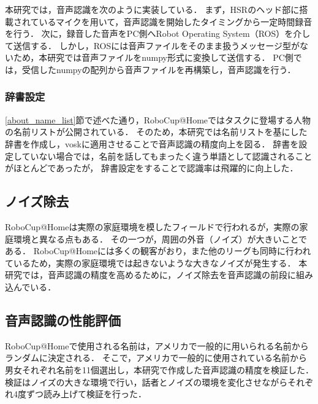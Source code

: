 \documentclass[a4j]{jarticle}
\begin{document}
本研究では，音声認識を次のように実装している．
まず，HSRのヘッド部に搭載されているマイクを用いて，音声認識を開始したタイミングから一定時間録音を行う．
次に，録音した音声をPC側へRobot Operating System（ROS）\cite{ros_wiki}を介して送信する．
しかし，ROSには音声ファイルをそのまま扱うメッセージ型がないため，本研究では音声ファイルをnumpy形式に変換して送信する．
PC側では，受信したnumpyの配列から音声ファイルを再構築し，音声認識を行う．

\subsubsection{辞書設定}
\ref{about_name_list}節で述べた通り，RoboCup@Homeではタスクに登場する人物の名前リストが公開されている．
そのため，本研究では名前リストを基にした辞書を作成し，voskに適用させることで音声認識の精度向上を図る．
辞書を設定していない場合では，名前を話してもまったく違う単語として認識されることがほとんどであったが，
辞書設定をすることで認識率は飛躍的に向上した．

\subsection{ノイズ除去}
RoboCup@Homeは実際の家庭環境を模したフィールドで行われるが，実際の家庭環境と異なる点もある．
その一つが，周囲の外音（ノイズ）が大きいことである．
RoboCup@Homeには多くの観客がおり，また他のリーグも同時に行われているため，実際の家庭環境では起きないような大きなノイズが発生する．
本研究では，音声認識の精度を高めるために，ノイズ除去\cite{sainburg2020finding}を音声認識の前段に組み込んでいる．

\subsection{音声認識の性能評価}
RoboCup@Homeで使用される名前は，アメリカで一般的に用いられる名前からランダムに決定される．
そこで，アメリカで一般的に使用されている名前から男女それぞれ名前を11個選出し，本研究で作成した音声認識の精度を検証した．
検証はノイズの大きな環境で行い，話者とノイズの環境を変化させながらそれぞれ4度ずつ読み上げて検証を行った．
\end{document}
